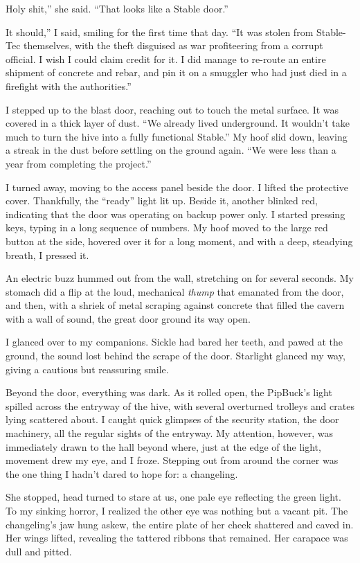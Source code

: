 \leavevmode{}Holy shit,” she said. “That looks like a Stable door.”

\leavevmode{}It should,” I said, smiling for the first time that day. “It was stolen from Stable-Tec themselves, with the theft disguised as war profiteering from a corrupt official. I wish I could claim credit for it. I did manage to re-route an entire shipment of concrete and rebar, and pin it on a smuggler who had just died in a firefight with the authorities.”

I stepped up to the blast door, reaching out to touch the metal surface. It was covered in a thick layer of dust. “We already lived underground. It wouldn’t take much to turn the hive into a fully functional Stable.” My hoof slid down, leaving a streak in the dust before settling on the ground again. “We were less than a year from completing the project.”

I turned away, moving to the access panel beside the door. I lifted the protective cover. Thankfully, the “ready” light lit up. Beside it, another blinked red, indicating that the door was operating on backup power only. I started pressing keys, typing in a long sequence of numbers. My hoof moved to the large red button at the side, hovered over it for a long moment, and with a deep, steadying breath, I pressed it.

An electric buzz hummed out from the wall, stretching on for several seconds. My stomach did a flip at the loud, mechanical \textit{thump} that emanated from the door, and then, with a shriek of metal scraping against concrete that filled the cavern with a wall of sound, the great door ground its way open.

I glanced over to my companions. Sickle had bared her teeth, and pawed at the ground, the sound lost behind the scrape of the door. Starlight glanced my way, giving a cautious but reassuring smile.

Beyond the door, everything was dark. As it rolled open, the PipBuck’s light spilled across the entryway of the hive, with several overturned trolleys and crates lying scattered about. I caught quick glimpses of the security station, the door machinery, all the regular sights of the entryway. My attention, however, was immediately drawn to the hall beyond where, just at the edge of the light, movement drew my eye, and I froze. Stepping out from around the corner was the one thing I hadn’t dared to hope for: a changeling.

She stopped, head turned to stare at us, one pale eye reflecting the green light. To my sinking horror, I realized the other eye was nothing but a vacant pit. The changeling’s jaw hung askew, the entire plate of her cheek shattered and caved in. Her wings lifted, revealing the tattered ribbons that remained. Her carapace was dull and pitted.

